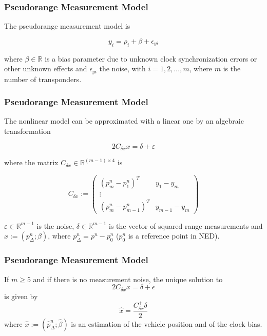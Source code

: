 \documentclass{beamer}
\begin{document}
	\begin{frame}
		\frametitle{Pseudorange Measurement Model}
		The pseudorange measurement model is
		
		\[ y_i = \rho_i + \beta + \epsilon_{yi} \]
		
		where $\beta \in \mathds{R}$ is a bias parameter due to unknown clock synchronization errors or other unknown effects and $\epsilon_{yi}$ the noise, with
		$i = 1,2,...,m$, where $m$ is the number of transponders.
	\end{frame}
	
	\begin{frame}
	\frametitle{Pseudorange Measurement Model}
	The nonlinear model can be approximated with a linear one by an algebraic transformation 
	
		\[ 2C_{\delta x}x = \delta + \varepsilon  \]
		
	where the matrix $C_{\delta x} \in \mathds{R}^{(m-1)\times4}$ is
	
	$$
	C_{\delta x} :=
	\begin{pmatrix}
	(p^n_m - p^n_1)^T & y_1 - y_m \\
	\vdots \\
	(p^n_m - p^n_{m-1})^T & y_{m-1} - y_m 
	\end{pmatrix} 
	$$
	
	$\varepsilon \in \mathds{R}^{m-1}$ is the noise, $\delta \in \mathds{R}^{m-1}$ is the vector of squared range measurements and $x := (p^n_\Delta;\beta)$, where $p_\Delta^n = p^n - p^n_0$ ($p_0^n$ is a reference point in NED). 
	\end{frame}

	\begin{frame}
		\frametitle{Pseudorange Measurement Model}
		If $m \geqslant 5$ and if there is no measurement noise, the unique solution to 
		$$ 2C_{\delta x} x = \delta + \epsilon $$
		is given by
		$$\hat{x} = \frac {C_{\delta x}^{+} \delta}{2}$$
		where $\hat{x} := (\hat{p}^n_\Delta;\hat{\beta})$ is an estimation of the vehicle position and of the clock bias.
\end{frame}
\end{document}
